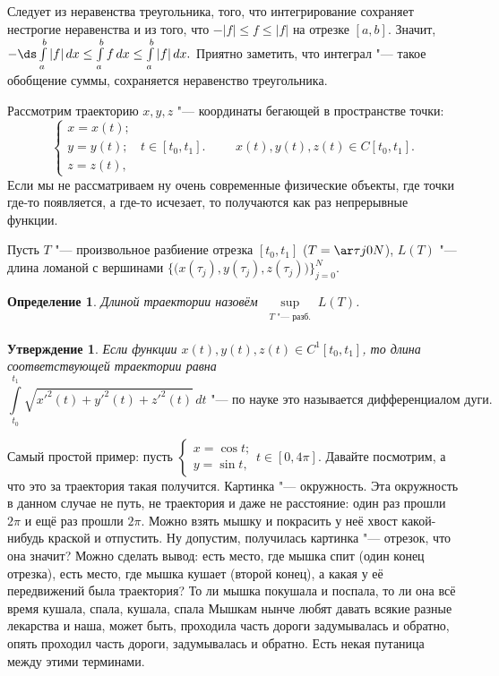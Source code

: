 \documentclass[a4paper,10pt,twoside]{article}
\newtheorem{Def}{Определение}[section]
\newtheorem{Ut}{Утверждение}[section]
\begin{document}
    Следует из неравенства треугольника, того, что интегрирование сохраняет нестрогие неравенства и из того, что 
    $-|f|\leq f\leq |f|$ на отрезке $[a,b]$. Значит, $-\ds\int\limits_a^b|f|\,dx\leq \int\limits_a^b f\,dx\leq\int\limits_a^b|f|\,dx.$
    Приятно заметить, что интеграл "--- такое обобщение суммы, сохраняется неравенство треугольника.
    
    Рассмотрим траекторию $x,y,z$ "--- координаты бегающей в пространстве точки: 
    \[\begin{cases}
    x=x(t);\\ y=y(t);& t\in[t_0,t_1].\\z=z(t),
    \end{cases}\qquad x(t),y(t),z(t)\in C[t_0,t_1].\]
    Если мы не рассматриваем ну очень современные физические объекты, где точки где-то появляется, а где-то исчезает, то получаются
    как раз непрерывные функции.
    
    Пусть $T$ "--- произвольное разбиение отрезка $[t_0,t_1]$ ($T=\ar\tau j0N$), $L(T)$ "--- длина ломаной с вершинами 
    $\Big\{\big(x(\tau_j),y(\tau_j),z(\tau_j)\big)\Big\}_{j=0}^N$.
    
    \begin{Def}
    	Длиной траектории назовём $\sup\limits_{\substack{T\text{ "--- разб.}\\ [t_0,t_1]}} L(T)$.
    \end{Def}
    
    \begin{Ut}
    	Если функции $x(t),y(t),z(t)\in C^1[t_0,t_1]$, то длина соответствующей траектории равна
    	$$\int\limits_{t_0}^{t_1}\sqrt{x'^2(t)+y'^2(t)+z'^2(t)}\,dt\text{ "--- по науке это называется дифференциалом дуги}.$$
    \end{Ut}
    
    Самый простой пример: пусть $\begin{cases}
    x=\cos t;\\ y=\sin t,
    \end{cases} t\in[0,4\pi]$. Давайте посмотрим, а что это за траектория такая получится.
    Картинка "--- окружность. Эта окружность в данном случае не путь, не траектория и даже не расстояние:
    один раз прошли $2\pi$ и ещё раз прошли $2\pi$.
    Можно взять мышку и покрасить у неё хвост какой-нибудь краской и отпустить. Ну допустим, получилась
    картинка "--- отрезок, что она значит? Можно сделать вывод: есть место, где мышка спит (один конец отрезка), есть
    место, где мышка кушает (второй конец), а какая у её передвижений была траектория? То ли мышка покушала и поспала, то ли
    она всё время кушала, спала, кушала, спала\ldotst{} Мышкам нынче любят давать всякие разные лекарства и
    наша, может быть, проходила часть дороги задумывалась и обратно, опять проходил часть дороги, задумывалась и обратно.
    Есть некая путаница между этими терминами.
    
\end{document}
